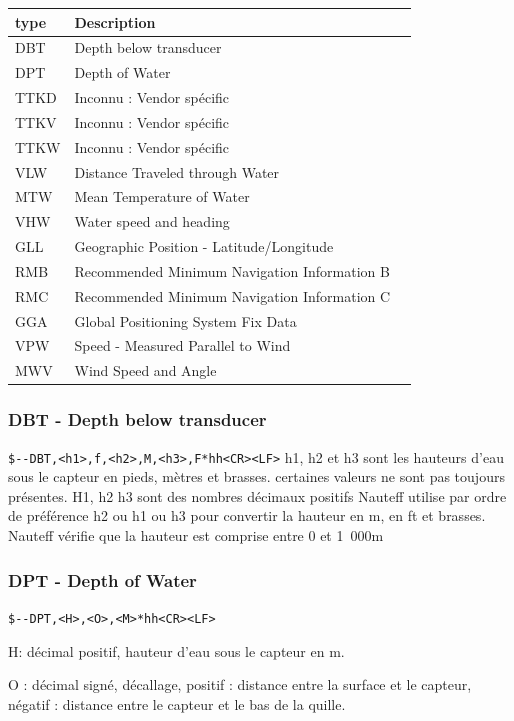 \documentclass[a4paper,11pt]{report}
\begin{document}
\begin{tabular}{|l|l|c|}
	\hline 
	type & Description &  \\ 
	\hline 
	DBT & Depth below transducer &  \\ 
	\hline 
	DPT & Depth of Water &  \\ 
	\hline 
	TTKD & Inconnu : Vendor spécific &  \\ 
	\hline 
	TTKV & Inconnu : Vendor spécific  &  \\ 
	\hline 
	TTKW & Inconnu : Vendor spécific  &  \\ 
	\hline 
	VLW & Distance Traveled through Water &  \\ 
	\hline 
	MTW & Mean Temperature of Water &  \\
	\hline 
	VHW & Water speed and heading &  \\
	\hline 
	GLL& Geographic Position - Latitude/Longitude &  \\
	\hline 
	RMB& Recommended Minimum Navigation Information B &  \\
	\hline 
	RMC& Recommended Minimum Navigation Information C &  \\
	\hline 
	GGA& Global Positioning System Fix Data &  \\
	\hline 
	VPW& Speed - Measured Parallel to Wind &  \\
	\hline 
	MWV& Wind Speed and Angle &  \\
	\hline 
\end{tabular}

\subsubsection{DBT - Depth below transducer}
\texttt{\${-}{-}DBT,<h1>,f,<h2>,M,<h3>,F*hh<CR><LF>}
h1, h2 et h3 sont les hauteurs d'eau sous le capteur en pieds, mètres et brasses.
certaines valeurs ne sont pas toujours présentes.
H1, h2 h3 sont des nombres décimaux positifs
Nauteff utilise par ordre de préférence h2 ou h1 ou h3
pour convertir la hauteur en m, en ft et brasses.
Nauteff vérifie que la hauteur est comprise entre 0 et 1~000m


\subsubsection{DPT - Depth of Water}
\texttt{\${-}{-}DPT,<H>,<O>,<M>*hh<CR><LF>}

H: décimal positif, hauteur d'eau sous le capteur en m.

O  : décimal signé,  décallage, positif : distance entre la surface et le capteur, négatif : distance entre le capteur et le bas de la quille.
\end{document}
